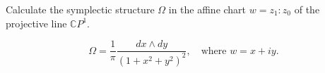 Calculate the symplectic structure $\Omega$ in the affine chart $w = z_1 : z_0$ of the projective line $\mathbb{C}P^1$.

$$\Omega = \frac{1}{\pi} \frac{dx \wedge dy}{(1 + x^2 + y^2)^2}, \quad \text{where } w = x + iy.$$
